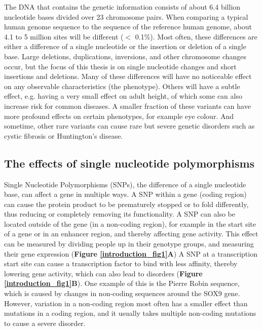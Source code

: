 The DNA that contains the genetic information consists of about 6.4 billion nucleotide bases divided over 23 chromosome pairs. When comparing a typical human genome sequence to the sequence of the reference human genome, about 4.1 to 5 million sites will be different ($<$ 0.1\%). Most often, these differences are either a difference of a single nucleotide or the insertion or deletion of a single base\cite{the1000genomesprojectconsortiumGlobalReferenceHuman2015a}. Large deletions, duplications, inversions, and other chromosome changes occur, but the focus of this thesis is on single nucleotide changes and short insertions and deletions. Many of these differences will have no noticeable effect on any observable characteristics (the phenotype). Others will have a subtle effect, e.g. having a very small effect on adult height, of which some can also increase risk for common diseases. A smaller fraction of these variants can have more profound effects on certain phenotypes, for example eye colour. And sometime, other rare variants can cause rare but severe genetic disorders such as cystic fibrosis or Huntington’s disease. 


\subsection{The effects of single nucleotide polymorphisms}

Single Nucleotide Polymorphisms (SNPs), the difference of a single nucleotide base, can affect a gene in multiple ways. A SNP within a gene (coding region) can cause the protein product to be prematurely stopped\cite{deboeverMedicalRelevanceProteintruncating2018} or to fold differently\cite{vihinenTypesEffectsProtein2015}, thus reducing or completely removing its functionality. A SNP can also be located outside of the gene (in a non-coding region), for example in the start site of a gene or in an enhancer region, and thereby affecting gene activity. This effect can be measured by dividing people up in their genotype groups, and measuring their gene expression (\textbf{Figure \ref{introduction_fig1}A}) A SNP at a transcription start site can cause a transcription factor to bind with less affinity, thereby lowering gene activity, which can also lead to disorders (\textbf{Figure \ref{introduction_fig1}B}). One example of this is the Pierre Robin sequence, which is caused by changes in non-coding sequences around the SOX9 gene\cite{benkoHighlyConservedNoncoding2009}. However, variation in a non-coding region most often has a smaller effect than mutations in a coding region, and it usually takes multiple non-coding mutations to cause a severe disorder.


